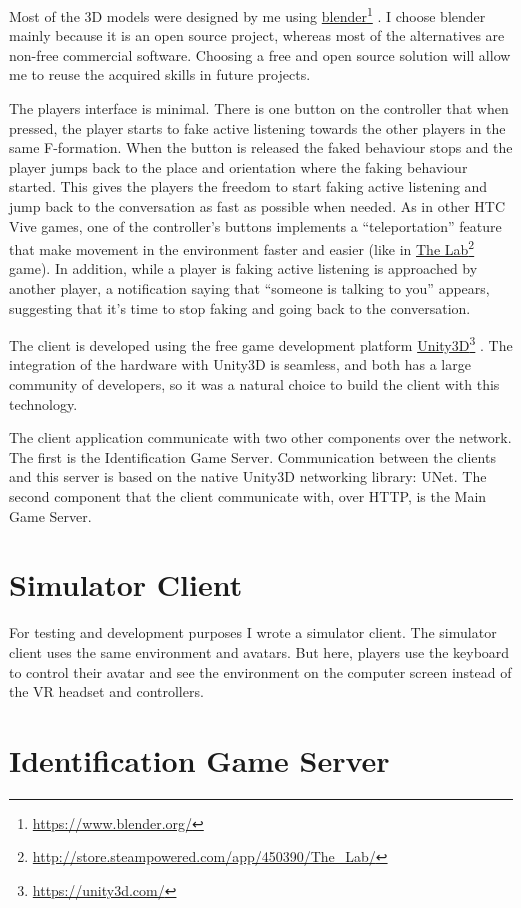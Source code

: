 \documentclass[]{simple-thesis}
\newcommand\fnurl[2]{%
  \href{#2}{#1}\footnote{\url{#2}}%
}
\begin{document}
Most of the 3D models were designed by me using \fnurl{blender}{https://www.blender.org/}.
I choose blender mainly because it is an open source project, whereas most of the alternatives are non-free commercial software.
Choosing a free and open source solution will allow me to reuse the acquired skills in future projects.

The players interface is minimal.
There is one button on the controller that when pressed, the player starts to fake active listening towards the other players in the same F-formation.
When the button is released the faked behaviour stops and the player jumps back to the place and orientation where the faking behaviour started.
This gives the players the freedom to start faking active listening and jump back to the conversation as fast as possible when needed.
As in other HTC Vive games, one of the controller's buttons implements a ``teleportation'' feature that make movement in the environment faster and easier (like in \fnurl{The Lab}{http://store.steampowered.com/app/450390/The_Lab/} game).
In addition, while a player is faking active listening is approached by another player, a notification saying that ``someone is talking to you'' appears, suggesting that it's time to stop faking and going back to the conversation.

The client is developed using the free game development platform \fnurl{Unity3D}{https://unity3d.com/}.
The integration of the hardware with Unity3D is seamless, and both has a large community of developers, so it was a natural choice to build the client with this technology.

The client application communicate with two other components over the network.
The first is the Identification Game Server.
Communication between the clients and this server is based on the native Unity3D networking library: UNet.
The second component that the client communicate with, over HTTP, is the Main Game Server.

\section{Simulator Client}

For testing and development purposes I wrote a simulator client.
The simulator client uses the same environment and avatars.
But here, players use the keyboard to control their avatar and see the environment on the computer screen instead of the VR headset and controllers.

\section{Identification Game Server}
\end{document}

